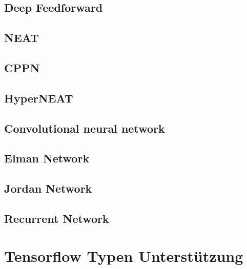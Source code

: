 \subsection{Deep Feedforward}

\subsection{NEAT}

\subsection{CPPN}

\subsection{HyperNEAT}

\subsection{Convolutional neural network}

\subsection{Elman Network}

\subsection{Jordan Network}

\subsection{Recurrent Network}

\section{Tensorflow Typen Unterstützung}
